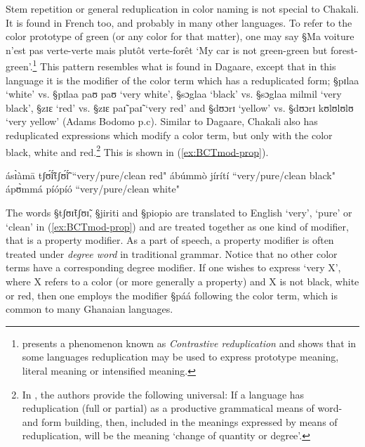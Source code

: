 Stem repetition or general reduplication in color naming is not special to
Chakali. It is found in  French too, and probably  in many other languages. To
refer to the color prototype of green (or any color for that matter), one may
say  {\S Ma voiture n'est pas verte-verte mais plutôt verte-forêt}
`My
car is not green-green but forest-green'.\footnote{ \cite{Ghom04} presents a
phenomenon known as {\it Contrastive reduplication} and  shows that in some
languages reduplication may be used to express prototype meaning,  literal
meaning or intensified meaning.}  This pattern resembles what is found in
Dagaare, except that in this language it is the modifier of the color term which
has a reduplicated form; {\S pɪlaa} `white' vs.  {\S pɪlaa paʊ paʊ} `very
white', {\S sɔglaa} `black' vs. {\S sɔglaa milmil} `very black', {\S zɪɛ} `red'
vs. {\S zɪɛ paɪ̃ paɪ̃} `very red' and {\S dʊɔrɪ}  `yellow' vs. {\S dʊɔrɪ
kʊlʊlʊlʊ} `very yellow' (Adams Bodomo p.c).  Similar to  Dagaare, Chakali also
has reduplicated expressions which modify a color term, but only with the color
black, white and red.\footnote{In \citealp[Universal~268]{Plan03}, the authors provide
the following universal: If  a language has reduplication (full or partial)
as a productive grammatical means of word- and form building, then, included in
the meanings expressed by means of reduplication, will be  the meaning `change
of quantity  or degree'.}   This is shown in (\ref{ex:BCTmod-prop}).


\begin{exe}
 \ex\label{ex:BCTmod-prop}
\begin{xlist}
 \ex\label{ex:BCTmod-prop-red} ásɪ̀àmā tʃʊ̃́ɪ̃́tʃʊ̃́ɪ̃́  ``very/pure/clean red" 
\ex\label{ex:BCTmod-prop-black} ábúmmò jírítí  ``very/pure/clean black"
\ex\label{ex:BCTmod-prop-white} ápʊ̀mmá píópíó ``very/pure/clean white"

\end{xlist}
\end{exe}


The words {\S tʃʊɪ̃tʃʊɪ̃},  {\S jiriti} and {\S piopio} are translated to
English `very',  `pure' or `clean' in (\ref{ex:BCTmod-prop}) and are treated
together as one kind of modifier, that is a property modifier. As a part of
speech, a property modifier is often treated under {\it degree word} in
traditional grammar. Notice that no other color terms have a corresponding
degree modifier. If one wishes to express `very X', where X refers to a color
(or more generally a property) and X is not black, white or red, then one
employs the modifier {\S páá} following the color term, which is common to
many Ghanaian languages. 


